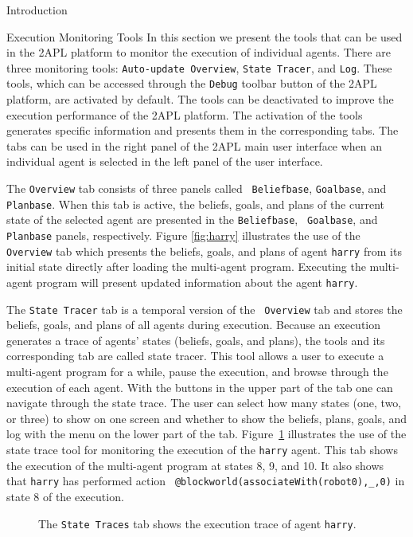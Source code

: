 \begin{chapter}{Introduction}
\begin{section}{Execution Monitoring Tools}
In this section we present the tools that can be used in the 2APL
platform to monitor the execution of individual agents. There are
three monitoring tools: {\tt Auto-update Overview}, {\tt State
Tracer}, and {\tt Log}. These tools, which can be accessed through
the {\tt Debug} toolbar button of the 2APL platform, are activated
by default. The tools can be deactivated to improve the execution
performance of the 2APL platform. The activation of the tools
generates specific information and presents them in the
corresponding tabs. The tabs can be used in the right panel of the
2APL main user interface when an individual agent is selected in the
left panel of the user interface.

The {\tt Overview} tab consists of three panels called {\tt
Beliefbase}, {\tt Goalbase}, and {\tt Planbase}. When this tab is
active, the beliefs, goals, and plans of the current state of the
selected agent are presented in the {\tt Beliefbase}, {\tt
Goalbase}, and {\tt Planbase} panels, respectively. Figure
\ref{fig:harry} illustrates the use of the {\tt Overview} tab which
presents the beliefs, goals, and plans of agent {\tt harry} from its
initial state directly after loading the multi-agent program.
Executing the multi-agent program will present updated information
about the agent {\tt harry}.

The {\tt State Tracer} tab is a temporal version of the {\tt
Overview} tab and stores the beliefs, goals, and plans of all agents
during execution. Because an execution generates a trace of agents'
states (beliefs, goals, and plans), the tools and its corresponding
tab are called state tracer. This tool allows a user to execute a
multi-agent program for a while, pause the execution, and browse
through the execution of each agent. With the buttons in the upper
part of the tab one can navigate through the state trace. The user
can select how many states (one, two, or three) to show on one
screen and whether to show the beliefs, plans, goals, and log with
the menu on the lower part of the tab. Figure~\ref{fig:statetracer}
illustrates the use of the state trace tool for monitoring the
execution of the {\tt harry} agent. This tab shows the execution of
the multi-agent program at states 8, 9, and 10. It also shows that
{\tt harry} has performed action {\tt
@blockworld(associateWith(robot0),\_,0)} in state 8 of the
execution.

\begin{figure}
    \begin{center}
        \caption{The {\tt State Traces} tab shows the execution trace of agent {\tt harry}.}\label{fig:statetracer}
    \end{center}
\end{figure}


\end{section}
\end{chapter}

